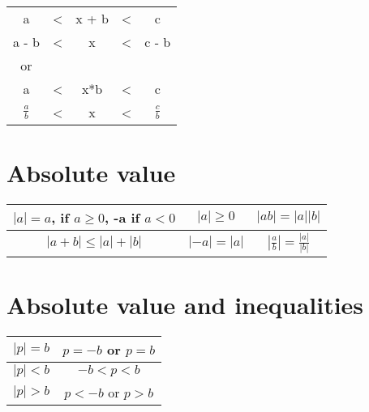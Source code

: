 \documentclass[10pt,onecolumn]{article}
\begin{document}
{ \\
\begin{tabular}{ccccc}
a & < & x + b & < & c \\
a - b & < & x & < & c - b \\ 
or \\
a & < & x*b & < & c \\
\(\frac{a}{b} \) & < & x & < & \(\frac{c}{b} \)\\

\end{tabular}

\section{Absolute value}
\begin{center}
{\renewcommand{\arraystretch}{2}
\begin{tabular}{| c | c | c |}
\hline
\(\left|a\right| = a \), if \(a \ge 0\), -a if \(a < 0\) &
\(\left|a\right| \ge 0 \) &
\(\left|ab\right| = \left|a\right|\left|b\right| \) \\
\hline
\(\left|a+b\right| \le \left|a\right| + \left|b\right|\) &
\(\left|-a\right| = \left|a\right| \) &
\(\left|\frac{a}{b}\right| = \frac{\left|a\right|}{\left|b\right|} \) \\
\hline
\end{tabular}}
\end{center}

\section{Absolute value and inequalities}
\begin{center}
{\renewcommand{\arraystretch}{2}
\begin{tabular}{| c | c |}
\hline
\(\left|p\right| = b \) & \(p = -b \) or \( p = b \) \\
\hline
\(\left|p\right| < b \) & \(-b < p < b \) \\
\hline
\(\left|p\right| > b \) & \(p < -b \) or \( p > b \) \\
\hline
\end{tabular}}
\end{center}

}
\end{document}
